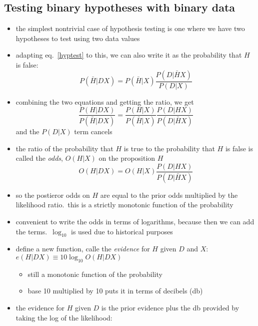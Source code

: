 \documentclass[../jaynes_prob_theory_notes.tex]{subfiles}
\begin{document}
\subsection{Testing binary hypotheses with binary data}
\begin{itemize}
    \item the simplest nontrivial case of hypothesis testing is one where we have two hypotheses to test using two data values
    \item adapting eq.~\ref{hyptest} to this, we can also write it as the probability that $H$ is false:
        \begin{equation*}
            P(\bar{H}|DX) = P(\bar{H}|X)\frac{P(D|\bar{H}X)}{P(D|X)}
        \end{equation*}
    \item combining the two equations and getting the ratio, we get
        \begin{equation*}
            \frac{P(H|DX)}{P(\bar{H}|DX)} = \frac{P(H|X)}{P(\bar{H}|X)}\frac{P(D|HX)}{P(D|\bar{H}X)}
        \end{equation*}
    and the $P(D|X)$ term cancels
    \item the ratio of the probability that $H$ is true to the probability that $H$ is false is called the \textit{odds}, $O(H|X)$ on the proposition $H$
        \begin{equation*}
            O(H|DX) = O(H|X)\frac{P(D|HX)}{P(D|\bar{H}X)}
        \end{equation*}
    \item so the postieror odds on $H$ are equal to the prior odds multiplied by the likelihood ratio.\ this is a strictly monotonic function of the probability
    \item convenient to write the odds in terms of logarithms, because then we can add the terms.\ $\log_{10}$ is used due to historical purposes
    \item define a new function, calle the \textit{evidence} for $H$ given $D$ and $X$: $e(H|DX) \equiv 10\log_{10}O(H|DX)$
        \begin{itemize}
            \item still a monotonic function of the probability
            \item base 10 multiplied by 10 puts it in terms of decibels (db)
        \end{itemize}
    \item the evidence for $H$ given $D$ is the prior evidence plus the db provided by taking the log of the likelihood:
        \begin{equation*}

\end{equation*}
\end{itemize}
\end{document}
